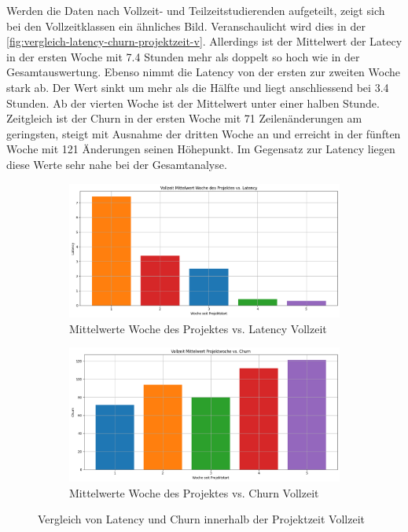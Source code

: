 Werden die Daten nach Vollzeit- und Teilzeitstudierenden aufgeteilt, zeigt sich bei den Vollzeitklassen ein ähnliches Bild. Veranschaulicht wird dies in der \autoref{fig:vergleich-latency-churn-projektzeit-v}. Allerdings ist der Mittelwert der Latecy in der ersten Woche mit 7.4 Stunden mehr als doppelt so hoch wie in der Gesamtauswertung. Ebenso nimmt die Latency von der ersten zur zweiten Woche stark ab. Der Wert sinkt um mehr als die Hälfte und liegt anschliessend bei 3.4 Stunden. Ab der vierten Woche ist der Mittelwert unter einer halben Stunde. Zeitgleich ist der Churn in der ersten Woche mit 71 Zeilenänderungen am geringsten, steigt mit Ausnahme der dritten Woche an und erreicht in der fünften Woche mit 121 Änderungen seinen Höhepunkt. Im Gegensatz zur Latency liegen diese Werte sehr nahe bei der Gesamtanalyse.
\begin{figure}[htbp]
    \centering
    \begin{subfigure}[b]{0.48\textwidth}
        \centering
        \includegraphics[width=\textwidth]{Figures/mittelwert-woche-lateny-v.png}
        \caption{Mittelwerte Woche des Projektes vs. Latency Vollzeit}
        \label{fig:mittelwert-woche-lateny-v}
    \end{subfigure}
    \hfill
    \begin{subfigure}[b]{0.48\textwidth}
        \centering
        \includegraphics[width=\textwidth]{Figures/mittelwert-woche-churn-v.png}
        \caption{Mittelwerte Woche des Projektes vs. Churn Vollzeit}
        \label{fig:mittelwert-woche-churn-v}
    \end{subfigure}
    \caption{Vergleich von Latency und Churn innerhalb der Projektzeit Vollzeit}
    \label{fig:vergleich-latency-churn-projektzeit-v}
\end{figure}


